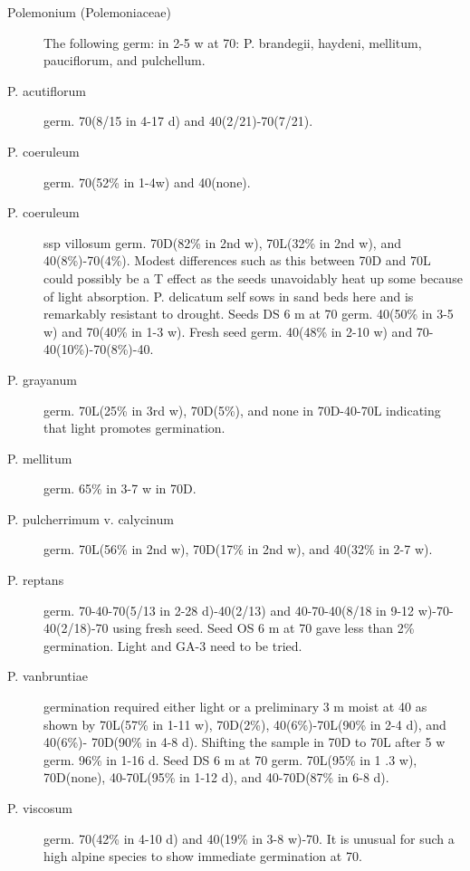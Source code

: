 \begin{description}
\item[Polemonium (Polemoniaceae)] The following germ: in 2-5 w at 70: P.
brandegii, haydeni, mellitum, pauciflorum, and pulchellum.
\item[P. acutiflorum] germ. 70(8/15 in 4-17 d) and 40(2/21)-70(7/21).
\item[P. coeruleum] germ. 70(52\% in 1-4w) and 40(none).
\item[P. coeruleum] ssp villosum germ. 70D(82\% in 2nd w), 70L(32\% in 2nd w), and
40(8\%)-70(4\%). Modest differences such as this between 70D and 70L could possibly
be a T effect as the seeds unavoidably heat up some because of light absorption.
P. delicatum self sows in sand beds here and is remarkably resistant to drought.
Seeds DS 6 m at 70 germ. 40(50\% in 3-5 w) and 70(40\% in 1-3 w). Fresh seed germ.
40(48\% in 2-10 w) and 70-40(10\%)-70(8\%)-40.
\item[P. grayanum] germ. 70L(25\% in 3rd w), 70D(5\%), and none in 70D-40-70L
indicating that light promotes germination.
\item[P. mellitum] germ. 65\% in 3-7 w in 70D.
\item[P. pulcherrimum v. calycinum] germ. 70L(56\% in 2nd w), 70D(17\% in 2nd w),
and 40(32\% in 2-7 w).
\item[P. reptans] germ. 70-40-70(5/13 in 2-28 d)-40(2/13) and 40-70-40(8/18 in 9-12
w)-70-40(2/18)-70 using fresh seed. Seed OS 6 m at 70 gave less than 2\%
germination. Light and GA-3 need to be tried.
\item[P. vanbruntiae] germination required either light or a preliminary 3 m moist at 40
as shown by 70L(57\% in 1-11 w), 70D(2\%), 40(6\%)-70L(90\% in 2-4 d), and 40(6\%)-
70D(90\% in 4-8 d). Shifting the sample in 70D to 70L after 5 w germ. 96\% in 1-16 d.
Seed DS 6 m at 70 germ. 70L(95\% in 1 .3 w), 70D(none), 40-70L(95\% in 1-12 d), and
40-70D(87\% in 6-8 d).
\item[P. viscosum] germ. 70(42\% in 4-10 d) and 40(19\% in 3-8 w)-70. It is unusual for
such a high alpine species to show immediate germination at 70.


\end{description}
